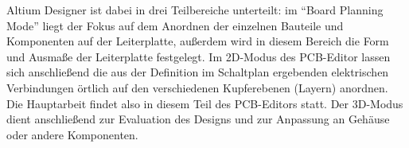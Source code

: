 Altium Designer ist dabei in drei Teilbereiche unterteilt: im \enquote{Board Planning Mode}  liegt der Fokus auf dem Anordnen der einzelnen Bauteile und Komponenten auf der Leiterplatte, außerdem wird in diesem Bereich die Form und Ausmaße der Leiterplatte festgelegt. Im 2D-Modus des \ac{PCB}-Editor lassen sich anschließend die aus der Definition im Schaltplan ergebenden elektrischen Verbindungen örtlich auf den verschiedenen Kupferebenen (Layern) anordnen. Die Hauptarbeit findet also in diesem Teil des \ac{PCB}-Editors statt. Der 3D-Modus dient anschließend zur Evaluation des Designs und zur Anpassung an Gehäuse oder andere Komponenten.

